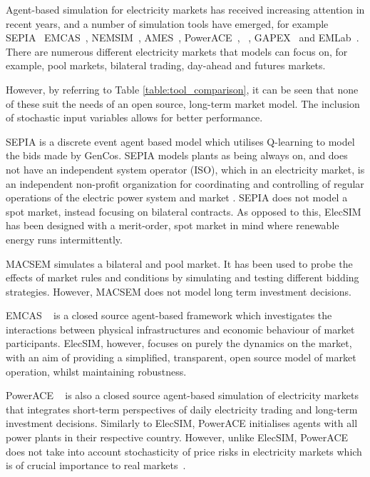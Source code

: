 Agent-based simulation for electricity markets has received increasing attention in recent years, and a number of simulation tools have emerged, for example SEPIA~\cite{Harp2000} EMCAS~\cite{Conzelmann}, NEMSIM~\cite{Batten2006}, AMES~\cite{Sun2007}, PowerACE~\cite{Rothengatter2007}, ~\cite{Praca2003}, GAPEX~\cite{Cincotti2013} and  EMLab~\cite{Chappin2017}. There are numerous different electricity markets that models can focus on, for example, pool markets, bilateral trading, day-ahead and futures markets.

However, by referring to Table \ref{table:tool_comparison}, it can be seen that none of these suit the needs of an open source, long-term market model. The inclusion of stochastic input variables allows for better performance.

SEPIA \cite{Harp2000} is a discrete event agent based model which utilises Q-learning to model the bids made by GenCos. SEPIA models plants as being always on, and does not have an independent system operator (ISO), which in an electricity market, is an independent non-profit organization for coordinating and controlling of regular operations of the electric power system and market  \cite{Zhou2007}. SEPIA does not model a spot market, instead focusing on bilateral contracts. As opposed to this, ElecSIM has been designed with a merit-order, spot market in mind where renewable energy runs intermittently.

MACSEM \cite{Praca2003} simulates a bilateral and pool market. It has been used to probe the effects of market rules and conditions by simulating and testing different bidding strategies. However, MACSEM does not model long term investment decisions.

EMCAS ~\cite{Conzelmann} is a closed source agent-based framework which investigates the interactions between physical infrastructures and economic behaviour of market participants. ElecSIM, however, focuses on purely the dynamics on the market, with an aim of providing a simplified, transparent, open source model of market operation, whilst maintaining robustness.

PowerACE ~\cite{Rothengatter2007} is also a closed source agent-based simulation of electricity markets that integrates short-term perspectives of daily electricity trading and long-term investment decisions. Similarly to ElecSIM, PowerACE initialises agents with all power plants in their respective country. However, unlike ElecSIM, PowerACE does not take into account stochasticity of price risks in electricity markets which is of crucial importance to real markets~\cite{Most2010}.


